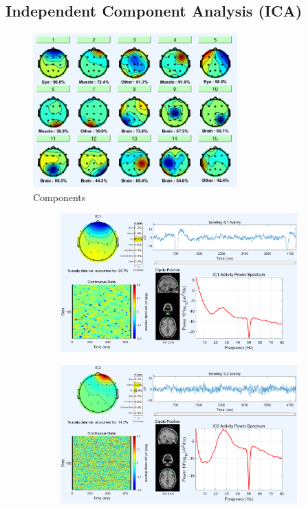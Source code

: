 \documentclass[hidelinks,12pt]{article}
\begin{document}
	\subsection{Independent Component Analysis (ICA)}
	\begin{figure}[h!]
		\centering
		\includegraphics[width=0.7\textwidth]{39}
		\caption{Components}
	\end{figure}
	
	\begin{figure}[!h]
		\centering
		\begin{subfigure}{0.4\textwidth}
			\centering
			\includegraphics[width=\linewidth]{mc/1}
		\end{subfigure}
		\hspace{1cm}
		\begin{subfigure}{0.4\textwidth}
			\centering
			\includegraphics[width=\linewidth]{mc/2}
		\end{subfigure}
	\end{figure}
	
\end{document}
